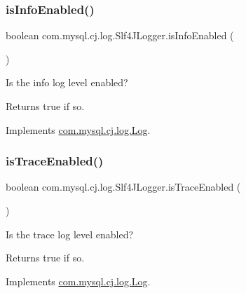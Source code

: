\subsubsection{\texorpdfstring{is\+Info\+Enabled()}{isInfoEnabled()}}
{\footnotesize\ttfamily boolean com.\+mysql.\+cj.\+log.\+Slf4\+J\+Logger.\+is\+Info\+Enabled (\begin{DoxyParamCaption}{ }\end{DoxyParamCaption})}

Is the \textquotesingle{}info\textquotesingle{} log level enabled?

\begin{DoxyReturn}{Returns}
true if so. 
\end{DoxyReturn}


Implements \mbox{\hyperlink{interfacecom_1_1mysql_1_1cj_1_1log_1_1_log_aecb7f781b61b516d6bad9ada8e7dd3aa}{com.\+mysql.\+cj.\+log.\+Log}}.

\mbox{\label{classcom_1_1mysql_1_1cj_1_1log_1_1_slf4_j_logger_afbf9106392050f7ca64b0ad7582b7517}} 
\subsubsection{\texorpdfstring{is\+Trace\+Enabled()}{isTraceEnabled()}}
{\footnotesize\ttfamily boolean com.\+mysql.\+cj.\+log.\+Slf4\+J\+Logger.\+is\+Trace\+Enabled (\begin{DoxyParamCaption}{ }\end{DoxyParamCaption})}

Is the \textquotesingle{}trace\textquotesingle{} log level enabled?

\begin{DoxyReturn}{Returns}
true if so. 
\end{DoxyReturn}


Implements \mbox{\hyperlink{interfacecom_1_1mysql_1_1cj_1_1log_1_1_log_a814070e176d987da656b45662bc63ccd}{com.\+mysql.\+cj.\+log.\+Log}}.

\mbox{\label{classcom_1_1mysql_1_1cj_1_1log_1_1_slf4_j_logger_aaf12f87af0d37c01118649ba65220a69}} 
